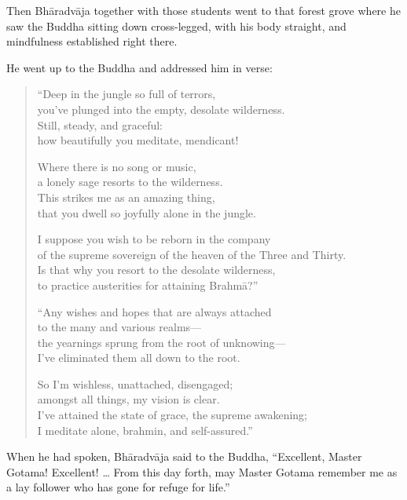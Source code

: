 \documentclass[12pt,openany]{book}%
\begin{document}
Then \textsanskrit{Bhāradvāja} together with those students went to that forest grove where he saw the Buddha sitting down cross-legged, with his body straight, and mindfulness established right there. 

He went up to the Buddha and addressed him in verse: 

\begin{verse}%
“Deep in the jungle so full of terrors, \\
you’ve plunged into the empty, desolate wilderness. \\
Still, steady, and graceful: \\
how beautifully you meditate, mendicant! 

Where there is no song or music, \\
a lonely sage resorts to the wilderness. \\
This strikes me as an amazing thing, \\
that you dwell so joyfully alone in the jungle. 

I suppose you wish to be reborn in the company \\
of the supreme sovereign of the heaven of the Three and Thirty. \\
Is that why you resort to the desolate wilderness, \\
to practice austerities for attaining \textsanskrit{Brahmā}?” 

“Any wishes and hopes that are always attached \\
to the many and various realms—\\
the yearnings sprung from the root of unknowing—\\
I’ve eliminated them all down to the root. 

So I’m wishless, unattached, disengaged; \\
amongst all things, my vision is clear. \\
I’ve attained the state of grace, the supreme awakening; \\
I meditate alone, brahmin, and self-assured.” 

%
\end{verse}

When he had spoken, \textsanskrit{Bhāradvāja} said to the Buddha, “Excellent, Master Gotama! Excellent! … From this day forth, may Master Gotama remember me as a lay follower who has gone for refuge for life.” 
\end{document}
